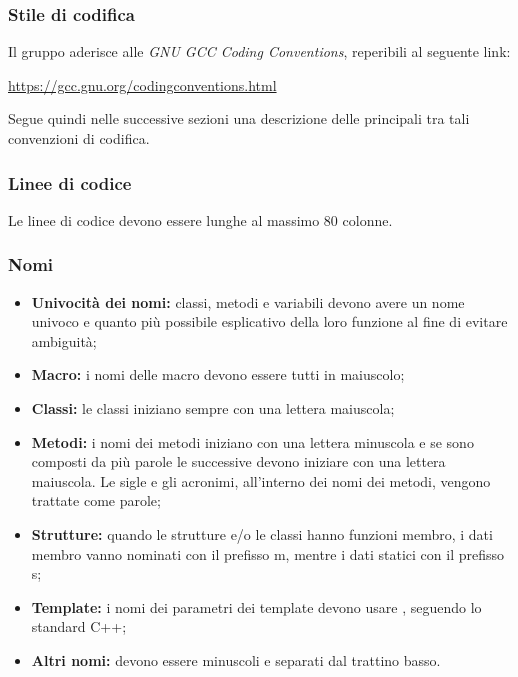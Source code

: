 \documentclass[../NomeDocumento.tex]{subfiles}
\begin{document}
	\subsubsection{Stile di codifica}
	Il gruppo aderisce alle \textit{GNU GCC Coding Conventions}, reperibili al seguente link:
	
	\begin{center}
		\url{https://gcc.gnu.org/codingconventions.html}
	\end{center}

	\noindent Segue quindi nelle successive sezioni una descrizione delle principali tra tali convenzioni di codifica.   
	
	\subsubsection*{Linee di codice}
		Le linee di codice devono essere lunghe al massimo 80 colonne.
		
	\subsubsection*{Nomi}
	\begin{itemize}
		\item \textbf{Univocità dei nomi:} classi, metodi e variabili devono avere un nome univoco e quanto più possibile esplicativo della loro funzione al fine di evitare ambiguità;
		
		\item \textbf{Macro:} i nomi delle macro devono essere tutti in maiuscolo;
		
		\item \textbf{Classi:} le classi iniziano sempre con una lettera maiuscola;
		
		\item \textbf{Metodi:} i nomi dei metodi iniziano con una lettera minuscola e se sono composti da più parole le successive devono iniziare con una lettera maiuscola. Le sigle e gli acronimi, all'interno dei nomi dei metodi, vengono trattate come parole;
		
		\item \textbf{Strutture:} quando le strutture e/o le classi hanno funzioni membro, i dati membro vanno nominati con il prefisso m\textunderscore , mentre i dati statici con il prefisso s\textunderscore;
		
		\item \textbf{Template:} i nomi dei parametri dei template devono usare , seguendo lo standard C++;
		
		\item \textbf{Altri nomi:} devono essere minuscoli e separati dal trattino basso.
	\end{itemize}	
	
\end{document}
